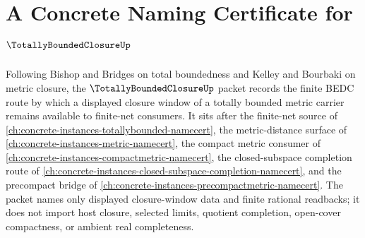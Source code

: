 \chapter{A Concrete Naming Certificate for $\TotallyBoundedClosureUp$}
\label{ch:concrete-instances-totally-bounded-closure-namecert}

Following Bishop and Bridges on total boundedness and Kelley and Bourbaki on metric closure, the $\TotallyBoundedClosureUp$ packet records the finite BEDC route by which a displayed closure window of a totally bounded metric carrier remains available to finite-net consumers. It sits after the finite-net source of \autoref{ch:concrete-instances-totallybounded-namecert}, the metric-distance surface of \autoref{ch:concrete-instances-metric-namecert}, the compact metric consumer of \autoref{ch:concrete-instances-compactmetric-namecert}, the closed-subspace completion route of \autoref{ch:concrete-instances-closed-subspace-completion-namecert}, and the precompact bridge of \autoref{ch:concrete-instances-precompactmetric-namecert}. The packet names only displayed closure-window data and finite rational readbacks; it does not import host closure, selected limits, quotient completion, open-cover compactness, or ambient real completeness.

